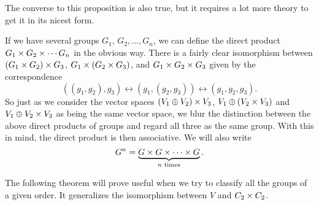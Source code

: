The converse to this proposition is also true, but it requires a lot more
theory to get it in its nicest form.

If we have several groups $G_{1}$, $G_{2}, \ldots, G_{n}$, we can define
the direct product $G_{1} \times G_{2} \times \cdots G_{n}$ in the obvious
way.  There is a fairly clear isomorphism between
$(G_{1} \times G_{2}) \times G_{3}$, $G_{1} \times (G_{2} \times G_{3})$, and
$G_{1} \times G_{2} \times G_{3}$ given by the correspondence
\[
  ((g_{1}, g_{2}), g_{3}) \leftrightarrow (g_{1}, (g_{2}, g_{3})) 
  \leftrightarrow (g_{1}, g_{2}, g_{3}).
\]
So just as we consider the vector spaces $(V_{1} \oplus V_{2}) \times V_{3}$,
$V_{1} \oplus (V_{2} \times V_{3})$ and  $V_{1} \oplus V_{2} \times V_{3}$ as
being the same vector space, we blur the distinction between the above
direct products of groups and regard all three as the same group.
With this in mind, the direct product is then associative.  We will also
write
\[
  G^{n} = \underbrace{G \times G \times \cdots \times G}_{\text{$n$ times}}.
\]

The following theorem will prove useful when we try to classify all the
groups of a given order.  It generalizes the isomorphism between $V$ and
$C_{2} \times C_{2}$.

